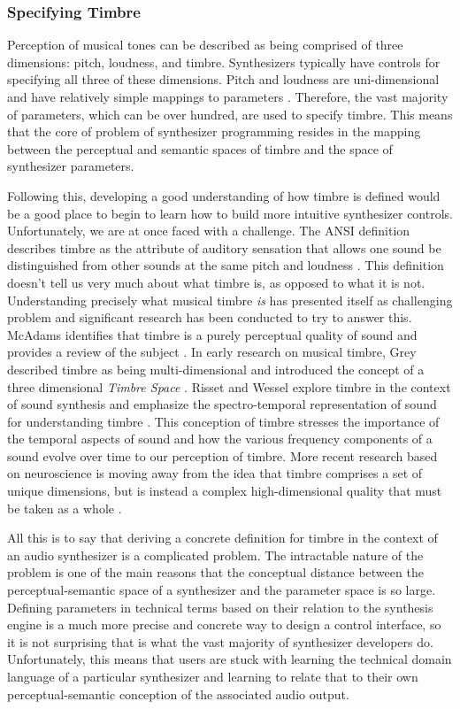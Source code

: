 \subsubsection{Specifying Timbre}
Perception of musical tones can be described as being comprised of three dimensions: pitch, loudness, and timbre. Synthesizers typically have controls for specifying all three of these dimensions. Pitch and loudness are uni-dimensional and have relatively simple mappings to parameters \cite{seago2004critical}. Therefore, the vast majority of parameters, which can be over hundred, are used to specify timbre. This means that the core of problem of synthesizer programming resides in the mapping between the perceptual and semantic spaces of timbre and the space of synthesizer parameters.
 
Following this, developing a good understanding of how timbre is defined would be a good place to begin to learn how to build more intuitive synthesizer controls. Unfortunately, we are at once faced with a challenge. The ANSI definition describes timbre as the attribute of auditory sensation that allows one sound be distinguished from other sounds at the same pitch and loudness \cite{american1973american}. This definition doesn't tell us very much about what timbre is, as opposed to what it is not. Understanding precisely what musical timbre \textit{is} has presented itself as challenging problem \cite{krumhansl1989musical} and significant research has been conducted to try to answer this. McAdams identifies that timbre is a purely perceptual quality of sound and provides a review of the subject \cite{mcadams2019}. In early research on musical timbre, Grey described timbre as being multi-dimensional and introduced the concept of a three dimensional \textit{Timbre Space} \cite{grey1977multidimensional}. Risset and Wessel explore timbre in the context of sound synthesis and emphasize the spectro-temporal representation of sound for understanding timbre \cite{risset1999exploration}. This conception of timbre stresses the importance of the temporal aspects of sound and how the various frequency components of a sound evolve over time to our perception of timbre. More recent research based on neuroscience is moving away from the idea that timbre comprises a set of unique dimensions, but is instead a complex high-dimensional quality that must be taken as a whole \cite{mcadams2019}. 

All this is to say that deriving a concrete definition for timbre in the context of an audio synthesizer is a complicated problem. The intractable nature of the problem is one of the main reasons that the conceptual distance between the perceptual-semantic space of a synthesizer and the parameter space is so large. Defining parameters in technical terms based on their relation to the synthesis engine is a much more precise and concrete way to design a control interface, so it is not surprising that is what the vast majority of synthesizer developers do. Unfortunately, this means that users are stuck with learning the technical domain language of a particular synthesizer and learning to relate that to their own perceptual-semantic conception of the associated audio output.

